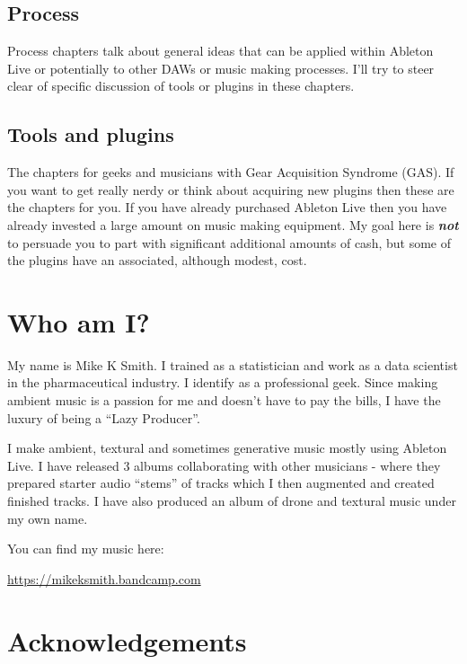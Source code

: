 \documentclass[
  12pt,
  letterpaper,
  oneside,
  open=any]{scrbook}
\begin{document}
\subsection*{Process}\label{process}

Process chapters talk about general ideas that can be applied within
Ableton Live or potentially to other DAWs or music making processes.
I'll try to steer clear of specific discussion of tools or plugins in
these chapters.

\subsection*{Tools and plugins}\label{tools-and-plugins}

The chapters for geeks and musicians with Gear Acquisition Syndrome
(GAS). If you want to get really nerdy or think about acquiring new
plugins then these are the chapters for you. If you have already
purchased Ableton Live then you have already invested a large amount on
music making equipment. My goal here is \textbf{\emph{not}} to persuade
you to part with significant additional amounts of cash, but some of the
plugins have an associated, although modest, cost.

\section*{Who am I?}\label{who-am-i}


My name is Mike K Smith. I trained as a statistician and work as a data
scientist in the pharmaceutical industry. I identify as a professional
geek. Since making ambient music is a passion for me and doesn't have to
pay the bills, I have the luxury of being a ``Lazy Producer''.

I make ambient, textural and sometimes generative music mostly using
Ableton Live. I have released 3 albums collaborating with other
musicians - where they prepared starter audio ``stems'' of tracks which
I then augmented and created finished tracks. I have also produced an
album of drone and textural music under my own name.

You can find my music here:

\url{https://mikeksmith.bandcamp.com}

\section*{Acknowledgements}\label{acknowledgements}
\end{document}
